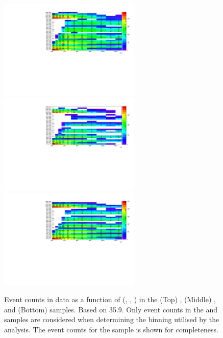 \begin{figure}[h!]
  \begin{center}
    {\includegraphics[width=0.6\textwidth]{figures/control_regions/SingleMu.pdf}} 
    {\includegraphics[width=0.6\textwidth]{figures/control_regions/DoubleMu.pdf}}
    {\includegraphics[width=0.6\textwidth]{figures/control_regions/SinglePhoton.pdf}}
    \caption{Event counts in data as a function of (\njet, \nb,
      \scalht) in the (Top) \mj, (Middle) \mmj, and (Bottom) \gj
      samples. Based on 35.9\fbinv. Only event counts in the \mj and
      \mmj samples are considered when determining the binning
      utilised by the analysis. The event counts for the \gj sample is
      shown for completeness.} 
    \label{fig:cr-counts}
  \end{center}
\end{figure}

